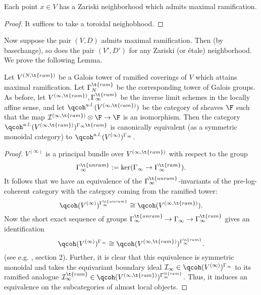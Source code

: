 \documentclass{article}
\newcommand{\I}{\mathcal{I}}
\begin{document}
\begin{prop}
  Each point $x\in V$ has a Zariski neighborhood which admits maximal ramification.
\end{prop}
\begin{proof}
It suffices to take a toroidal neighobhood. 
\end{proof}
Now suppose the pair $(V,D)$ admits maximal ramification. Then (by basechange), so does the pair $(V', D')$ for any Zariski (or \'etale) neighborhood. We prove the following Lemma.
\begin{lm}
  Let $V^{(N,\t{ram})}$ be a Galois tower of ramified coverings of $V$ which attains maximal ramification. Let $\Gamma_N^{\t{ram}}$ be the corresponding tower of Galois groups. As before, let $V^{(\infty, \t{ram})}, \Gamma_\infty^{\t{ram}}$ be the inverse limit schemes in the locally affine sense, and let $\qcoh^{a.l.}(V^{(\infty, \t{ram})})$ be the category of sheaves $\F$ such that the map $\I^{(\infty, \t{ram})}\otimes\F \to \F$ is an isomorphism. Then the category $\qcoh^{a.l.}(V^{(\infty,\t{ram})})^{\Gamma_\infty\t{ram}}$ is canonically equivalent (as a symmetric monoidal category) to $\qcoh^{a.l.}(V^{(\infty)})^{\Gamma_\infty}$. 
\end{lm}
\begin{proof}
$V^{(\infty)}$ is a principal bundle over $V^{(\infty,\t{ram})}$ with respect to the group $$\Gamma_{\infty}^{\t{unram}}: = \ker(\Gamma_\infty\to \Gamma_\infty^{\t{ram}}).$$ It follows that we have an equivalence of the $\Gamma_\infty^{\t{unram}}$-invariants of the pre-log-coherent category with the category coming from the ramified tower: $$\qcoh(V^{(\infty)})^{\Gamma_\infty^{\t{unram}}}\cong \qcoh(V^{(\infty, \t{ram})}).$$ Now the short exact sequence of groups $\Gamma_{\infty}^{\t{unram}}\to \Gamma_\infty\to \Gamma_\infty^{\t{ram}}$ gives an identification $$\qcoh(V^{(\infty)})^{\Gamma_\infty}\cong \qcoh(V^{(\infty, \t{ram})})^{\Gamma_\infty^{\t{ram}}}.$$
(see e.g. \cite{vtor}, section 2). Further, it is clear that this equivalence is symmetric monoidal and takes the equivariant boundary ideal $\I_\infty\in \qcoh(V^{(\infty)})^{\Gamma_\infty}$ to its ramified analogue $\I_\infty^{\t{ram}}\in \qcoh(V^{(\infty, \t{ram})})^{\Gamma_{\infty}^{\t{ram}}}$. Thus, it induces an equivalence on the subcategories of almost local objects. 
\end{proof}
\end{document}
